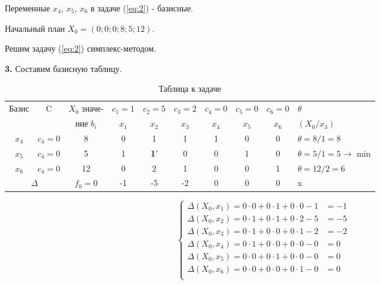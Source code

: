 Переменные $x_4$, $x_5$, $x_6$ в задаче (\ref{eq:2}) - базисные.

Начальный план $X_0 = (0;0;0;8;5;12)$.

Решим задачу (\ref{eq:2}) симплекс-методом.

\textbf{3.}
Составим базисную таблицу.

\begin{table}[h!]
  \scriptsize

  \centering

  \caption{Таблица к задаче}
  \label{tab:2}

  \begin{tabular}{|c|c|c|c|||c|||c|c|c|c|l|} 
    \hline
    Базис &C                      &$X_0$ значе-          &$c_1=1$  &$c_2=5$  &$c_3=2$  &$c_4=0$  &$c_5=0$  &$c_6=0$  &$\theta$\\
          &                       &ние $b_i$      &$x_1$    &$x_2$    &$x_3$    &$x_4$    &$x_5$    &$x_6$    &$(X_0/x_3)$\\ \hline
    $x_4$ &$c_4=0$                &8              &0        &1        &1        &1        &0        &0        &$\theta = 8/1=8$ \\ \hline\hline\hline
    $x_5$ &$c_4=0$                &5              &1        &\textbf{1}'&0      &0        &1        &0        &$\theta = 5/1=5 \to$ min \\ \hline\hline\hline
    $x_6$ &$c_4=0$                &12             &0        &2        &1        &0        &0        &1        &$\theta = 12/2=6$ \\ \hline
    \multicolumn{2}{|c|}{$\Delta$}&$f_0=0$        &-1       &-5       &-2       &0        &0        &0        & x \\\hline
  \end{tabular}
\end{table}

\begin{equation*}\label{eq:2}
  \begin{cases}
    \Delta(X_0, x_1) = 0 \cdot 0 + 0 \cdot 1 + 0 \cdot 0 - 1 & = -1 \\
    \Delta(X_0, x_2) = 0 \cdot 1 + 0 \cdot 1 + 0 \cdot 2 - 5 & = -5 \\
    \Delta(X_0, x_3) = 0 \cdot 1 + 0 \cdot 0 + 0 \cdot 1 - 2 & = -2 \\
    \Delta(X_0, x_4) = 0 \cdot 1 + 0 \cdot 0 + 0 \cdot 0 - 0 & = 0 \\
    \Delta(X_0, x_5) = 0 \cdot 0 + 0 \cdot 1 + 0 \cdot 0 - 0 & = 0 \\
    \Delta(X_0, x_6) = 0 \cdot 0 + 0 \cdot 0 + 0 \cdot 1 - 0 & = 0 \\
  \end{cases}
\end{equation*}

